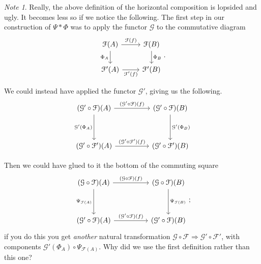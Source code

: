 \documentclass[a4paper,10pt]{scrreprt}
\theoremstyle{definition}
\theoremstyle{plain}
\theoremstyle{remark}
\newtheorem{note}{Note}[section]
\begin{document}
\begin{note}
  Really, the above definition of the horizontal composition is lopsided and ugly. It becomes less so if we notice the following. The first step in our construction of $\Psi * \Phi$ was to apply the functor $\mathcal{G}$ to the commutative diagram
  \begin{equation*}
    \begin{tikzcd}
      \mathcal{F}(A)
      \arrow[d, swap, "\Phi_{A}"] 
      \arrow[r, "\mathcal{F}(f)"] 
      & \mathcal{F}(B)
      \arrow[d, "\Phi_{B}"] 
      \\
      \mathcal{F}'(A) 
      \arrow[r, swap, "\mathcal{F}'(f)"] 
      & \mathcal{F}'(B) 
    \end{tikzcd}.
  \end{equation*}

  We could instead have applied the functor $\mathcal{G}'$, giving us the following.
  \begin{equation*}
    \begin{tikzcd}[row sep=huge, column sep=huge]
      (\mathcal{G}' \circ \mathcal{F})(A)
      \arrow[d, swap, "\mathcal{G}'(\Phi_{A})"] 
      \arrow[r, "(\mathcal{G}' \circ \mathcal{F})(f)"] 
      & (\mathcal{G}' \circ \mathcal{F})(B)
      \arrow[d, "\mathcal{G}'(\Phi_{B})"] 
      \\
      (\mathcal{G}' \circ \mathcal{F}')(A) 
      \arrow[r, "(\mathcal{G}' \circ \mathcal{F}')(f)"] 
      & (\mathcal{G}' \circ \mathcal{F}')(B) 
    \end{tikzcd}
  \end{equation*}

  Then we could have glued to it the bottom of the commuting square
  \begin{equation*}
    \begin{tikzcd}[row sep=huge, column sep=huge]
      (\mathcal{G} \circ \mathcal{F})(A)
      \arrow[r, "(\mathcal{G} \circ \mathcal{F})(f)"]
      \arrow[d, swap, "\Psi_{\mathcal{F}(A)}"]
      & (\mathcal{G} \circ \mathcal{F})(B)
      \arrow[d, "\Psi_{\mathcal{F}(B)}"]
      \\
      (\mathcal{G}' \circ \mathcal{F})(A)
      \arrow[r, "(\mathcal{G}' \circ \mathcal{F})(f)"]
      & (\mathcal{G}' \circ \mathcal{F})(B)
    \end{tikzcd};
  \end{equation*}
  if you do this you get \emph{another} natural transformation $\mathcal{G} \circ \mathcal{F} \Rightarrow \mathcal{G}' \circ \mathcal{F}'$, with components $\mathcal{G}'(\Phi_{A}) \circ \Psi_{\mathcal{F}(A)}$. Why did we use the first definition rather than this one? 


\end{note}
\end{document}

